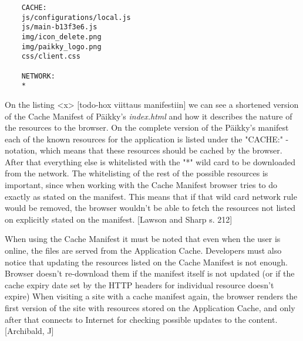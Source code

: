 \begin{lstlisting}
    CACHE:
    js/configurations/local.js
    js/main-b13f3e6.js
    img/icon_delete.png
    img/paikky_logo.png
    css/client.css

    NETWORK:
    *
\end{lstlisting} %

On the listing <x> [todo-hox viittaus manifestiin] we can see a shortened version of the Cache Manifest of Päikky's \textit{index.html} and how it describes the nature of the resources to the browser. On the complete version of the Päikky's manifest each of the known resources for the application is listed under the "CACHE:" -notation, which means that these resources should be cached by the browser. After that everything else is whitelisted with the "*" wild card to be downloaded from the network. The whitelisting of the rest of the possible resources is important, since when working with the Cache Manifest browser tries to do exactly as stated on the manifest. This means that if that wild card network rule would be removed, the browser wouldn't be able to fetch the resources not listed on explicitly stated on the manifest. [Lawson and Sharp s. 212] %


When using the Cache Manifest it must be noted that even when the user is online, the files are served from the Application Cache. Developers must also notice that updating the resources listed on the Cache Manifest is not enough. Browser doesn't re-download them if the manifest itself is not updated (or if the cache expiry date set by the HTTP headers for individual resource doesn't expire) When visiting a site with a cache manifest again, the browser renders the first version of the site with resources stored on the Application Cache, and only after that connects to Internet for checking possible updates to the content. [Archibald, J]

